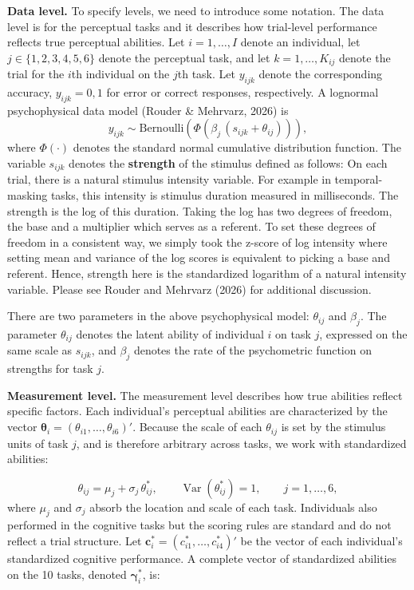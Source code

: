 \documentclass[
  ,man]{apa6}
\begin{document}
\textbf{Data level.} To specify levels, we need to introduce some notation. The data level is for the perceptual tasks and it describes how trial-level performance reflects true perceptual abilities. Let \(i = 1,\dots,I\) denote an individual, let \(j \in \{1,2,3,4,5,6\}\) denote the perceptual task, and let \(k = 1,\dots,K_{ij}\) denote the trial for the \(i\)th individual on the \(j\)th task. Let \(y_{ijk}\) denote the corresponding accuracy, \(y_{ijk}=0,1\) for error or correct responses, respectively. A lognormal psychophysical data model (Rouder \& Mehrvarz, 2026) is \[y_{ijk} \sim \text{Bernoulli}\!\left(\Phi\!\left(\beta_j\,(s_{ijk}+\theta_{ij})\right)\right),\] where \(\Phi(\cdot)\) denotes the standard normal cumulative distribution function. The variable \(s_{ijk}\) denotes the \textbf{strength} of the stimulus defined as follows: On each trial, there is a natural stimulus intensity variable. For example in temporal-masking tasks, this intensity is stimulus duration measured in milliseconds. The strength is the log of this duration. Taking the log has two degrees of freedom, the base and a multiplier which serves as a referent. To set these degrees of freedom in a consistent way, we simply took the z-score of log intensity where setting mean and variance of the log scores is equivalent to picking a base and referent. Hence, strength here is the standardized logarithm of a natural intensity variable. Please see Rouder and Mehrvarz (2026) for additional discussion.

There are two parameters in the above psychophysical model: \(\theta_{ij}\) and \(\beta_j\). The parameter \(\theta_{ij}\) denotes the latent ability of individual \(i\) on task \(j\), expressed on the same scale as \(s_{ijk}\), and \(\beta_j\) denotes the rate of the psychometric function on strengths for task \(j\).

\textbf{Measurement level.} The measurement level describes how true abilities reflect specific factors. Each individual's perceptual abilities are characterized by the vector \(\boldsymbol{\theta}_i=(\theta_{i1},\ldots,\theta_{i6})'\). Because the scale of each \(\theta_{ij}\) is set by the stimulus units of task \(j\), and is therefore arbitrary across tasks, we work with standardized abilities:

\[\theta_{ij} = \mu_j + \sigma_j\,\theta^*_{ij}, \qquad \operatorname{Var}(\theta^*_{ij}) = 1, \qquad j = 1,\ldots,6,\]
where \(\mu_j\) and \(\sigma_j\) absorb the location and scale of each task. Individuals also performed in the cognitive tasks but the scoring rules are standard and do not reflect a trial structure. Let \(\boldsymbol{c}^*_i=(c^*_{i1},\ldots,c^*_{i4})'\) be the vector of each individual's standardized cognitive performance. A complete vector of standardized abilities on the 10 tasks, denoted \(\boldsymbol{\gamma}^*_i\), is:
\end{document}
